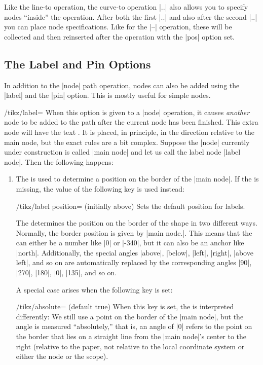 Like the line-to operation, the curve-to operation |..| also allows you to
specify nodes ``inside'' the operation. After both the first |..| and
also after the second |..| you can place node specifications. Like for
the |--| operation, these will be collected and then reinserted after
the operation with the |pos| option set.


\subsection{The Label and Pin Options}

In addition to the |node| path operation, nodes can also be added
using the |label| and the |pin| option. This is mostly useful
for simple nodes.

\begin{key}{/tikz/label=}
  \label{label-option}%
  When this option is given to a |node| operation, it causes
  \emph{another} node to be added to the path after the current node
  has been finished. This extra node will have the text
  . It is placed, in principle, in the direction
   relative to the main node, but the exact rules are a
  bit complex. Suppose the |node| currently under construction is called
  |main node| and let us call the label node |label node|. Then the
  following happens:
  \begin{enumerate}
  \item The  is used to determine a position on the border
    of the |main node|. If the  is missing, the value of
    the following key is used instead:
    \begin{key}{/tikz/label position= (initially above)}
      Sets the default position for labels.
    \end{key}
    The  determines the position on the border of the
    shape in two different ways. Normally, the border position is
    given by |main node.|. This means that the
     can either be a number like |0| or |-340|, but it can
    also be an anchor like |north|. Additionally, the special angles
    |above|, |below|, |left|, |right|, |above left|, and so on are
    automatically replaced by the corresponding angles |90|, |270|,
    |180|, |0|, |135|, and so on.

    A special case arises when the following key is set:
    \begin{key}{/tikz/absolute= (default true)}
      When this key is set, the  is interpreted
      differently: We still use a point on the border of the
      |main node|, but the angle is measured ``absolutely,'' that is,
      an angle of |0| refers to the point on the border that lies on a
      straight line from the |main node|'s center to the right
      (relative to the paper, not relative to the local coordinate
      system or either the node or the scope).


\end{key}
\end{enumerate}
\end{key}
